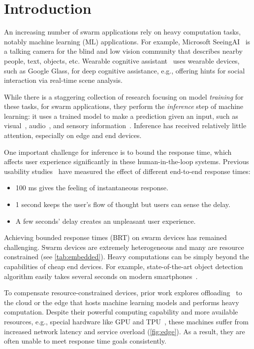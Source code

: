 \section{Introduction}
\label{sec:introduction}

An increasing number of swarm applications rely on heavy computation tasks,
notably machine learning (ML) applications. For example, Microsoft
SeeingAI~\cite{seeingai} is a talking camera for the blind and low vision
community that describes nearby people, text, objects, etc. Wearable cognitive
assistant~\cite{ha2014towards} uses wearable devices, such as Google Glass, for
deep cognitive assistance, e.g., offering hints for social interaction via
real-time scene analysis.

While there is a staggering collection of research focusing on model
\textit{training} for these tasks, for swarm applications, they perform the
\textit{inference} step of machine learning: it uses a trained model to make a
prediction given an input, such as visual~\cite{googlelens, ha2014towards,
  seeingai}, audio~\cite{alexa, applesiri, cortana}, and sensory
information~\cite{laput2017synthetic, lu2010jigsaw}. Inference has received
relatively little attention, especially on edge and end devices.

One important challenge for inference is to bound the response time, which
affects user experience significantly in these human-in-the-loop
systems. Previous usability studies~\cite{nielsen1994usability,
  schneiderman1998designing} have measured the effect of different end-to-end
response times:

\begin{itemize}[noitemsep, topsep=0pt]
\item 100 ms gives the feeling of instantaneous response.
\item 1 second keeps the user's flow of thought but users can sense the delay.
\item A few seconds' delay creates an unpleasant user experience.
\end{itemize}

Achieving bounded response times (BRT) on swarm devices has remained
challenging. Swarm devices are extremely heterogeneous and many are resource
constrained (see \autoref{tab:embedded}). Heavy computations can be simply
beyond the capabilities of cheap end devices. For example, state-of-the-art
object detection algorithm easily takes several seconds on modern
smartphones~\cite{chen2015glimpse}.

To compensate resource-constrained devices, prior work explores
offloading~\cite{chun2011clonecloud,cuervo2010maui} to the cloud or the edge
that hosts machine learning models and performs heavy computation. Despite their
powerful computing capability and more available resources, e.g., special
hardware like GPU and TPU~\cite{jouppi2017datacenter}, these machines suffer
from increased network latency and service overload (\autoref{fig:edge}). As a
result, they are often unable to meet response time goals consistently.

